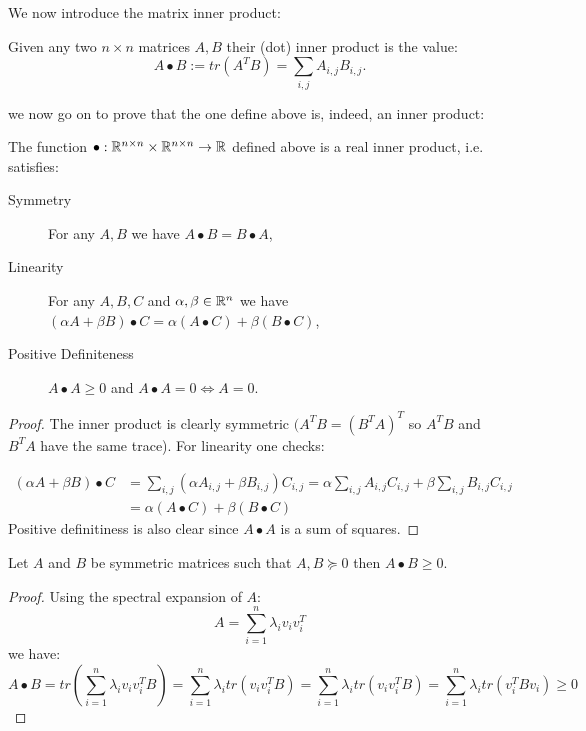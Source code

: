 We now introduce the matrix inner product:
\begin{definition}
Given any two $n \times n$ matrices $A,B$ their (dot) inner product is the value:
\[
    A \bullet B := tr(A^TB) = \sum_{i,j} A_{i,j}B_{i,j}.
\]
\end{definition}
we now go on to prove that the one define above is, indeed, an inner product:
\begin{proposition}
The function $\bullet: \mathbb{R}^{n\times n}\times \mathbb{R}^{n\times n} \to \mathbb{R}$ defined above is a real inner product, i.e. satisfies:
\begin{description}
    \item[Symmetry] For any $A,B$ we have $A \bullet B = B \bullet A$,
    \item[Linearity] For any $A,B,C$ and $\alpha,\beta \in \mathbb{R}^n$ we have $(\alpha A+ \beta B) \bullet C = \alpha (A \bullet C) + \beta (B \bullet C)$,
    \item[Positive Definiteness] $A \bullet A \geq 0$ and $A \bullet A = 0 \iff A = 0$.
\end{description}
\end{proposition}
\begin{proof}
The inner product is clearly symmetric $(A^TB = (B^TA)^T$ so $A^TB$ and $B^TA$ have the same trace). For linearity one checks:

\begin{align}
    (\alpha A+ \beta B) \bullet C &= \sum_{i,j}(\alpha A_{i,j} + \beta B_{i,j})C_{i,j} = \alpha \sum_{i,j} A_{i,j} C_{i,j} + \beta \sum_{i,j} B_{i,j}C_{i,j} \\
    &= \alpha (A \bullet C) + \beta (B \bullet C)
\end{align}
Positive definitiness is also clear since $A \bullet A$ is a sum of squares.
\end{proof}

\begin{proposition}
Let $A$ and $B$ be symmetric matrices such that $A,B \succeq 0$ then $A \bullet B \geq 0$.
\end{proposition}
\begin{proof}
Using the spectral expansion of $A$:
\[
    A = \sum_{i=1}^n \lambda_iv_iv_i^T
\]
we have:
\[
    A \bullet B = tr\left(\sum_{i=1}^n \lambda_i v_iv_i^TB\right) = \sum_{i=1}^n\lambda_i tr\left(v_iv_i^TB\right) = \sum_{i=1}^n\lambda_i tr\left(v_iv_i^TB\right) = \sum_{i=1}^n\lambda_i tr\left(v_i^TBv_i\right) \geq 0
\]
\end{proof}
